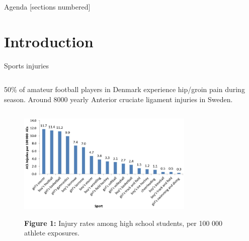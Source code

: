 \maketitle

\begin{frame}{Agenda}
  [sections numbered]
  \tableofcontents[hideallsubsections]
\end{frame}

\section{Introduction}
\begin{frame}[fragile]{Sports injuries}
    \begin{columns}[T,onlytextwidth]
        {\small50\% of amateur football players in Denmark experience hip/groin pain during season\footnotemark.}
        {\small Around 8000 yearly Anterior cruciate ligament injuries in Sweden\footnotemark.}
    \end{columns}
    \begin{figure}
      \centering
      \includegraphics[width=0.75\textwidth]{files/figs/presentation/acl-injury-per-ae.png}

      {\scriptsize\textbf{Figure 1:} Injury rates among high school students, per 100 000 athlete exposures\footnotemark.}
    \end{figure}



\end{frame}

